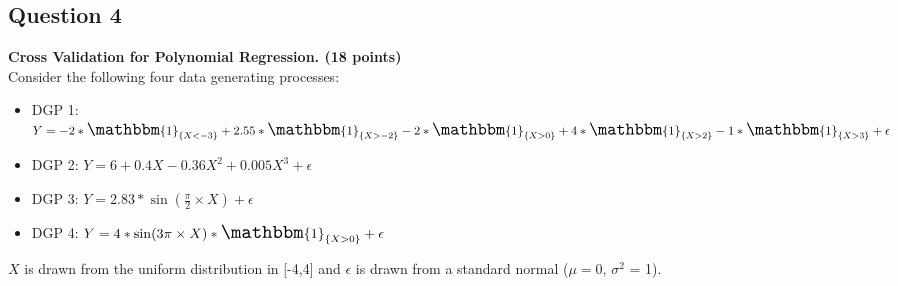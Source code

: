 \documentclass[11pt,english]{article}
\newcommand{\one}{\Large \mathbbm{1}}
\begin{document}
\subsection*{Question 4}
\textbf{Cross Validation for Polynomial Regression. (18 points)} \\
Consider the following four data generating processes:
  \begin{itemize}
  \item  DGP 1: $Y = -2* \one_{\{X < -3\}} + 2.55* \one_{\{ X > -2\}} - 2* \one_{\{X>0\}} + 4* \one_{\{X > 2\}} -1* \one_{\{ X > 3\}}+ \epsilon$
    \item DGP 2: $Y = 6 + 0.4 X - 0.36X^2 + 0.005 X^3 + \epsilon$
      \item DGP 3: $Y = 2.83 * \sin(\frac{\pi}{2} \times X) +
        \epsilon $
      \item DGP 4: $Y = 4 * \sin(3 \pi \times X) * \one_{\{X>0\}}+ \epsilon$
  \end{itemize}
  $X$ is drawn from the uniform distribution in [-4,4] and $\epsilon
  $
  is drawn from a standard normal ($\mu =0$, $\sigma^2$ = 1).
\end{document}
